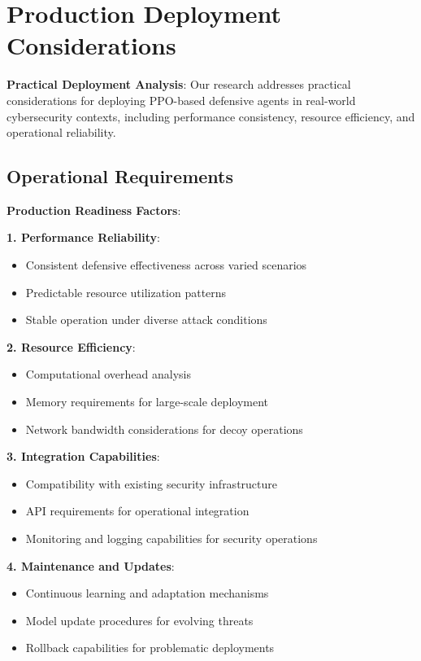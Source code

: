 \documentclass[11pt]{article}
\begin{document}
\section{Production Deployment Considerations}

\begin{foundation}
\textbf{Practical Deployment Analysis}: Our research addresses practical considerations for deploying PPO-based defensive agents in real-world cybersecurity contexts, including performance consistency, resource efficiency, and operational reliability.
\end{foundation}

\subsection{Operational Requirements}

\begin{example}
\textbf{Production Readiness Factors}:

\textbf{1. Performance Reliability}:
\begin{itemize}
\item Consistent defensive effectiveness across varied scenarios
\item Predictable resource utilization patterns
\item Stable operation under diverse attack conditions
\end{itemize}

\textbf{2. Resource Efficiency}:
\begin{itemize}
\item Computational overhead analysis
\item Memory requirements for large-scale deployment
\item Network bandwidth considerations for decoy operations
\end{itemize}

\textbf{3. Integration Capabilities}:
\begin{itemize}
\item Compatibility with existing security infrastructure
\item API requirements for operational integration
\item Monitoring and logging capabilities for security operations
\end{itemize}

\textbf{4. Maintenance and Updates}:
\begin{itemize}
\item Continuous learning and adaptation mechanisms
\item Model update procedures for evolving threats
\item Rollback capabilities for problematic deployments
\end{itemize}
\end{example}
\end{document}
